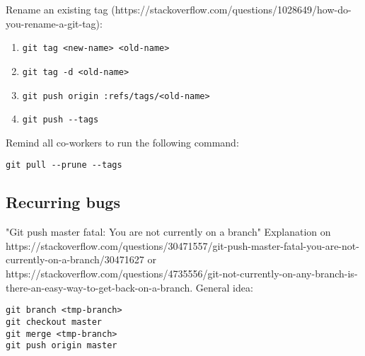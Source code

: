 \documentclass{article}
\begin{document}
Rename an existing tag (https://stackoverflow.com/questions/1028649/how-do-you-rename-a-git-tag):
\begin{enumerate}
    \item 
    \begin{verbatim}
git tag <new-name> <old-name>
    \end{verbatim}
    \item
    \begin{verbatim}
git tag -d <old-name>
    \end{verbatim}
    \item
    \begin{verbatim}
git push origin :refs/tags/<old-name>
    \end{verbatim}
    \item
    \begin{verbatim}
git push --tags
    \end{verbatim}
\end{enumerate}

Remind all co-workers to run the following command:
\begin{verbatim}
git pull --prune --tags
\end{verbatim}

\subsection{Recurring bugs}

"Git push master fatal: You are not currently on a branch"
Explanation on https://stackoverflow.com/questions/30471557/git-push-master-fatal-you-are-not-currently-on-a-branch/30471627 or https://stackoverflow.com/questions/4735556/git-not-currently-on-any-branch-is-there-an-easy-way-to-get-back-on-a-branch.
General idea:
\begin{verbatim}
git branch <tmp-branch>
git checkout master
git merge <tmp-branch>
git push origin master
\end{verbatim}
\end{document}
